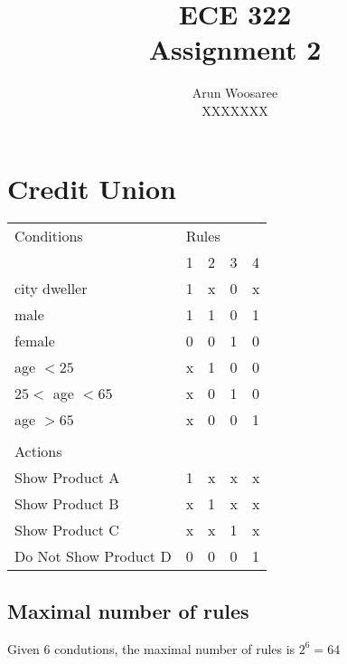 \documentclass[letterpaper]{article}
\title{ECE 322 \\
Assignment 2}
\author{Arun Woosaree\\
  XXXXXXX}
\begin{document}
\maketitle %

\section{Credit Union}
\begin{adjustbox}{center}
	\begin{tabular}{lllll}
		Conditions            & \multicolumn{4}{l}{Rules}             \\
		                      & 1                         & 2 & 3 & 4 \\ \cline{2-5}
		city dweller          & 1                         & x & 0 & x \\
		male                  & 1                         & 1 & 0 & 1 \\
		female                & 0                         & 0 & 1 & 0 \\
		age $<25$             & x                         & 1 & 0 & 0 \\
		$25<$ age $<65$       & x                         & 0 & 1 & 0 \\
		age $>65$             & x                         & 0 & 0 & 1 \\
		                      &                           &   &   &   \\
		Actions               &                           &   &   &   \\ \cline{1-1}
		Show Product A        & 1                         & x & x & x \\
		Show Product B        & x                         & 1 & x & x \\
		Show Product C        & x                         & x & 1 & x \\
		Do Not Show Product D & 0                         & 0 & 0 & 1 \\
	\end{tabular}%
\end{adjustbox}
\subsection{Maximal number of rules}
Given 6 condutions, the maximal number of rules is $2^6=64$
\end{document}
